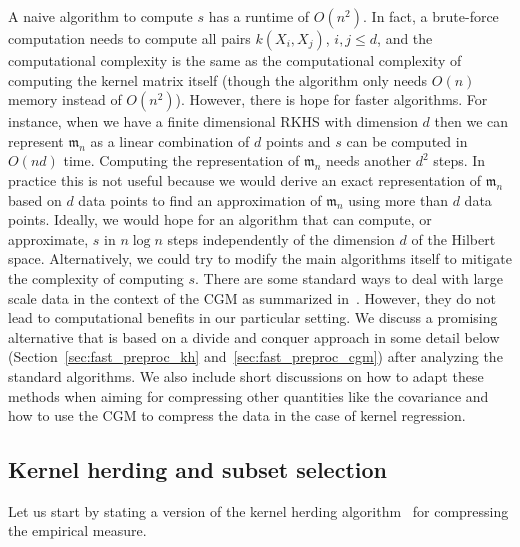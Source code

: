 \documentclass[AHL,Unicode,longabstracts,published]{cedram}
\theoremstyle{remark}
\newcommand{\mean}{\mathfrak{m}}
\newcounter{setofstep}
\newcounter{step}[setofstep]
\begin{document}
A naive algorithm to compute $s$ has a runtime of $O(n^2)$. In fact, a brute-force computation needs to compute all pairs $k(X_i,X_j)$, $i,j \leq d$, and the computational complexity is the same as the computational complexity of computing the kernel matrix itself (though the algorithm only needs $O(n)$ memory instead of $O(n^2)$). However, there is hope for faster algorithms. For instance, when we have a finite dimensional RKHS with dimension $d$ then we can represent $\mean_n$ as a linear combination of $d$ points and $s$ can be computed in $O(n d)$ time. Computing the representation of $\mean_n$ needs another $d^2$ steps. In practice this is not useful because we would derive an exact representation of $\mean_n$ based on $d$ data points to find an approximation of $\mean_n$ using more than $d$ data points. Ideally, we would hope for an algorithm that can compute, or approximate, $s$ in $n \log n$ steps independently of the dimension $d$ of the Hilbert space. Alternatively, we could try to modify the main algorithms itself to mitigate the complexity of computing $s$. There are some standard ways to deal with large scale data in the context of the CGM as summarized in~\cite{BRAU22}. However, they do not lead to computational benefits in our particular setting. We discuss a promising alternative that is based on a divide and conquer approach in some detail below (Section~\ref{sec:fast_preproc_kh} and~\ref{sec:fast_preproc_cgm}) after analyzing the standard algorithms. We also include short discussions on how to adapt these methods when aiming for compressing other quantities like the covariance and how to use the CGM to compress the data in the case of kernel regression.

\subsection{Kernel herding and subset selection} Let us start by stating a version of the kernel herding algorithm~\cite{CHEN10} for compressing the empirical measure.
\end{document}
